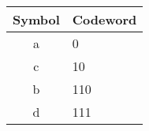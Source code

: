 \documentclass{subfiles}
\begin{document}
    \begin{table*}[!hb]
        \centering
        \begin{tabular}{|c|l|}
            \hline
            \textbf{Symbol} & \textbf{Codeword} \\ 
            \hline
            a & \textcolor{rpLove}{0} \\ 
            c & \textcolor{rpLove}{1}\textcolor{rpGold}{0} \\ 
            b & \textcolor{rpLove}{1}\textcolor{rpGold}{1}\textcolor{rpRose}{0} \\
            d & \textcolor{rpLove}{1}\textcolor{rpGold}{1}\textcolor{rpRose}{1} \\
            \hline
        \end{tabular}
    \end{table*}
\end{document}
